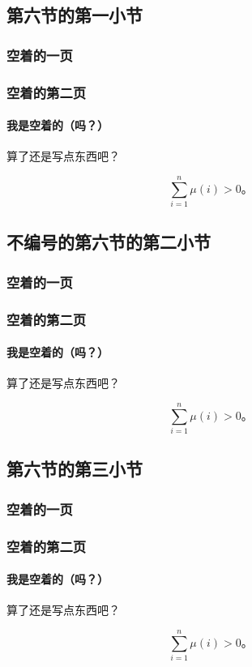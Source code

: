 \documentclass{../pkslide}
\begin{document}
\subsection{第六节的第一小节}

\begin{frame}
  \frametitle{空着的一页}
\end{frame}

\begin{frame}
  \frametitle{空着的第二页}
  \framesubtitle{我是空着的（吗？）}
  
  算了还是写点东西吧？
  
  \[ \sum_{i = 1}^{n} \mu(i) > 0 \text{。} \]
\end{frame}

\subsection*{不编号的第六节的第二小节}

\begin{frame}
  \frametitle{空着的一页}
\end{frame}

\begin{frame}
  \frametitle{空着的第二页}
  \framesubtitle{我是空着的（吗？）}
  
  算了还是写点东西吧？
  
  \[ \sum_{i = 1}^{n} \mu(i) > 0 \text{。} \]
\end{frame}

\subsection{第六节的第三小节}

\begin{frame}
  \frametitle{空着的一页}
\end{frame}

\begin{frame}
  \frametitle{空着的第二页}
  \framesubtitle{我是空着的（吗？）}
  
  算了还是写点东西吧？
  
  \[ \sum_{i = 1}^{n} \mu(i) > 0 \text{。} \]
\end{frame}
\end{document}
